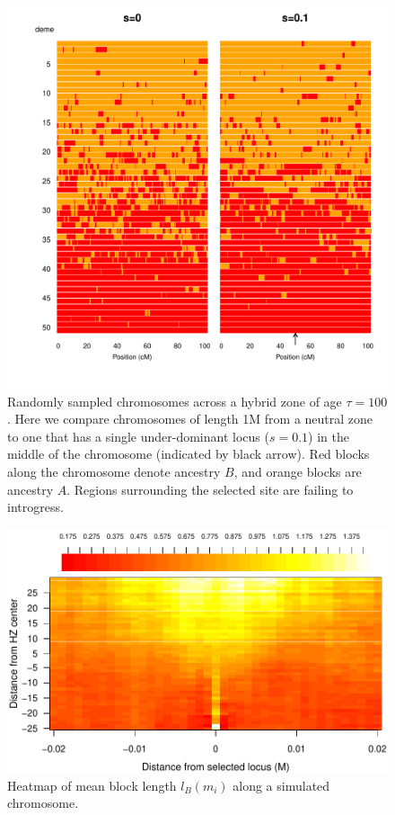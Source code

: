 \documentclass[12pt,titlepage]{article}
\begin{document}
\begin{figure}
\includegraphics[width=\textwidth]{figs/plot_chromosomes_tau100}
\caption{Randomly sampled chromosomes  across a hybrid zone of age $\tau=100$. Here we compare chromosomes of length 1M from a neutral zone to one that has a single under-dominant locus ($s=0.1$) in the middle of the chromosome (indicated by black arrow). Red blocks along the chromosome denote ancestry $B$, and orange blocks are ancestry $A$. Regions surrounding the selected site are failing to introgress.
 }\label{Fig:resistanceToIntrogression100g}
\end{figure}


\begin{figure}
\includegraphics{figs/blocksAlongChromHeatmapAncBConditioning}
\caption{Heatmap of mean block length $l_B(m_i)$ along a simulated chromosome. }\label{Supp:blockLengthHeatmap}
\end{figure}
\end{document}
